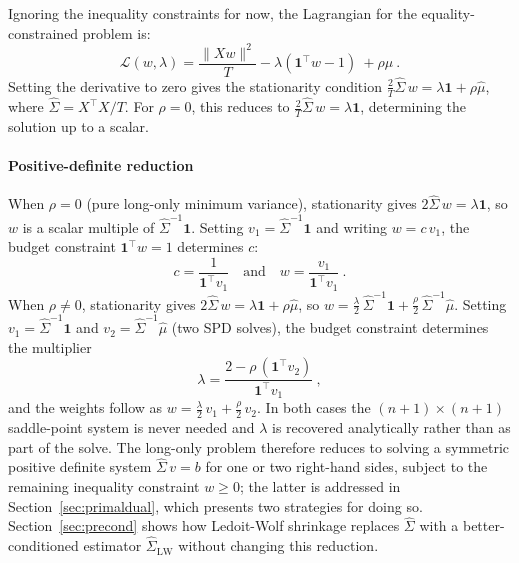 Ignoring the inequality constraints for now, the Lagrangian for the equality-constrained problem is:
\[
\mathcal{L}(w, \lambda) = \frac{\|Xw\|^2}{T} - \lambda(\mathbf{1}^\top w - 1)~ + \rho \hat \mu~.
\]
Setting the derivative to zero gives the stationarity condition
$\frac{2}{T}\hat\Sigma\, w = \lambda \mathbf{1} + \rho\hat \mu$, where $\hat\Sigma = X^\top X/T$.
For $\rho = 0$, this reduces to $\frac{2}{T}\hat\Sigma\, w = \lambda\mathbf{1}$, determining the solution up to a scalar.

\paragraph{Positive-definite reduction}
When $\rho = 0$ (pure long-only minimum variance), stationarity gives $2\hat\Sigma\, w = \lambda\mathbf{1}$,
so $w$ is a scalar multiple of $\hat\Sigma^{-1}\mathbf{1}$.
Setting $v_1 = \hat\Sigma^{-1}\mathbf{1}$ and writing $w = c\,v_1$, the budget constraint
$\mathbf{1}^\top w = 1$ determines $c$:
\[
  c = \frac{1}{\mathbf{1}^\top v_1} \quad \mbox{and} \quad w = \frac{v_1}{\mathbf{1}^\top v_1}~.
\]
When $\rho \neq 0$, stationarity gives $2\hat\Sigma\, w = \lambda\mathbf{1} + \rho\hat \mu$, so
$w = \tfrac{\lambda}{2}\,\hat\Sigma^{-1}\mathbf{1} + \tfrac{\rho}{2}\,\hat\Sigma^{-1}\hat \mu$.
Setting $v_1 = \hat\Sigma^{-1}\mathbf{1}$ and $v_2 = \hat\Sigma^{-1}\hat \mu$ (two SPD solves), the budget
constraint determines the multiplier
\[
  \lambda = \frac{2 - \rho\,(\mathbf{1}^\top v_2)}{\mathbf{1}^\top v_1}~,
\]
and the weights follow as $w = \tfrac{\lambda}{2}\,v_1 + \tfrac{\rho}{2}\,v_2$.
In both cases the $(n+1)\times(n+1)$ saddle-point system is never needed and $\lambda$ is
recovered analytically rather than as part of the solve.
The long-only problem therefore reduces to solving a symmetric positive definite system
$\hat\Sigma\,v = b$ for one or two right-hand sides, subject to the remaining inequality
constraint $w \geq 0$; the latter is addressed in Section~\ref{sec:primaldual}, which
presents two strategies for doing so. Section~\ref{sec:precond} shows how Ledoit-Wolf
shrinkage replaces $\hat\Sigma$ with a better-conditioned estimator $\hat\Sigma_{\mathrm{LW}}$
without changing this reduction.
